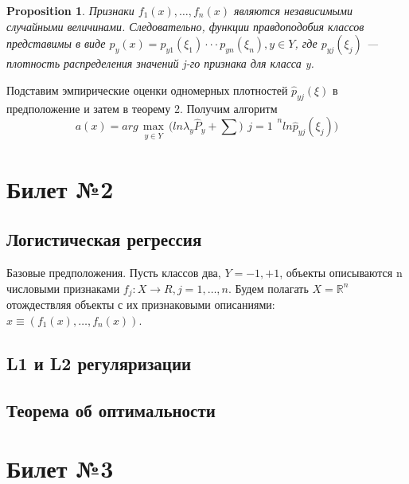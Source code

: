\documentclass[a4paper]{article}
\theoremstyle{plain}
\newtheorem{proposition}{Proposition}
\theoremstyle{remark}
\theoremstyle{definition}
\newcommand{\setR}{\mathbb{R}}
\begin{document}
\begin{proposition}
Признаки $f_1(x),\ldots, f_n(x)$ являются независимыми случайными величинами. Следовательно, функции правдоподобия классов представимы в виде $p_y(x) = p_{y1}(\xi_1)· · · p_{yn}(\xi_n), y \in Y$, где $p_{yj} (\xi_j )$ — плотность распределения значений j-го признака для класса y.
\end{proposition}
Подставим эмпирические оценки одномерных плотностей $\hat{p}_{yj} (\xi)$ в предположение и затем в теорему 2. Получим алгоритм
$$ a(x) = arg \max_{\substack{y \in Y}} \bigg( ln \lambda_y \hat{P}_y + \sum){\substack{j=1}}^n ln \hat{p}_{yj}(\xi_j) \bigg) $$

\section{Билет №2}
\subsection{Логистическая регрессия}
Базовые предположения. Пусть классов два, $Y = {-1, +1}$, объекты описываются n числовыми признаками $f_j: X \rightarrow R, j = 1, \ldots , n$. Будем полагать $X = \setR^n$ отождествляя объекты с их признаковыми описаниями: $x \equiv (f_1(x), \ldots , f_n(x))$.
\subsection{L1 и L2 регуляризации}

\subsection{Теорема об оптимальности}

\section{Билет №3}
\end{document}

